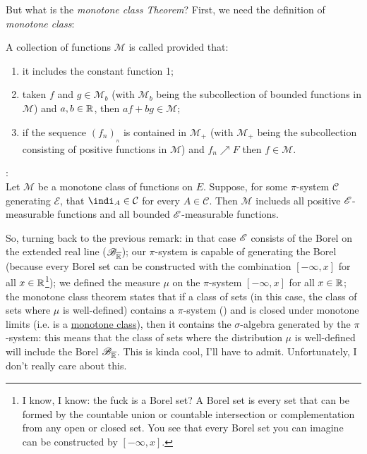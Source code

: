 \documentclass{report}
\begin{document}
\begin{revise}
	But what is the \textit{monotone class Theorem}? First, we need the definition of \textit{monotone class}:
	\begin{definition}
		A collection of functions $\mathcal{M}$ is called  provided that:
		\begin{enumerate}
			\item it includes the constant function 1;
			\item taken $f$ and $g\in\mathcal{M}_b$ (with $\mathcal{M}_b$ being the subcollection of bounded functions in $\mathcal{M}$) and $a,b\in\mathbb{R}$, then $af+bg\in\mathcal{M}$;
			\item if the sequence $(f_n)_{_n}$ is contained in $\mathcal{M}_+$ (with $\mathcal{M}_+$ being the subcollection consisting of positive functions in $\mathcal{M}$) and $f_n\nearrow F$ then $f\in\mathcal{M}$.
		\end{enumerate}
	\end{definition}
	\begin{theorem}
		:\\
		Let $\mathcal{M}$ be a monotone class of functions on $E$. Suppose, for some $\pi$-system $\mathcal{C}$ generating $\mathscr{E}$, that $\indi_A\in\mathcal{C}$ for every $A\in\mathcal{C}$. Then $\mathcal{M}$ inclueds all positive $\mathscr{E}$-measurable functions and all bounded $\mathscr{E}$-measurable functions.
	\end{theorem}
\end{revise}
So, turning back to the previous remark: in that case $\mathscr{E}$ consists of the Borel \sa{} on the extended real line ($\mathscr{B}_{\overline{\mathbb{R}}}$); our $\pi$-system is capable of generating the Borel \sa{} (because every Borel set can be constructed with the combination $[-\infty,x]$ for all $x\in\mathbb{R}$\footnote{I know, I know: the fuck is a Borel set? A Borel set is every set that can be formed by the countable union or countable intersection or complementation from any open or closed set. You see that every Borel set you can imagine can be constructed by $[-\infty,x]$.}); we defined the measure $\mu$ on the $\pi$-system $[-\infty,x]$ for all $x\in\mathbb{R}$; the monotone class theorem states that if a class of sets (in this case, the class of sets where $\mu$ is well-defined) contains a $\pi$-system (\checkmark) and is closed under monotone limits (i.e. is a \underline{monotone class}), then it contains the $\sigma$-algebra generated by the $\pi$-system: this means that the class of sets where the distribution $\mu$ is well-defined will include the Borel \sa{} $\mathscr{B}_{\overline{\mathbb{R}}}$. This is kinda cool, I'll have to admit. Unfortunately, I don't really care about this.
\end{document}
